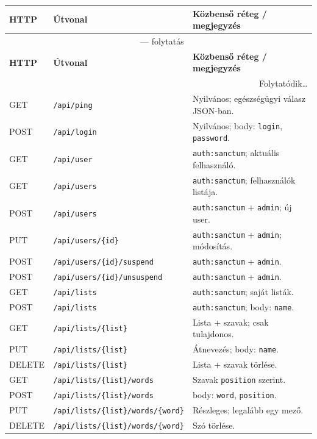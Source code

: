 {\small
\begin{longtable}{@{}llp{6.8cm}@{}}
\toprule
\textbf{HTTP} & \textbf{Útvonal} & \textbf{Közbenső réteg / megjegyzés} \\
\midrule
\endfirsthead
\multicolumn{3}{c}{\tablename\ \thetable{} — folytatás} \\
\toprule
\textbf{HTTP} & \textbf{Útvonal} & \textbf{Közbenső réteg / megjegyzés} \\
\midrule
\endhead
\midrule
\multicolumn{3}{r}{Folytatódik\ldots} \\
\endfoot
\bottomrule
\endlastfoot

GET & \texttt{/api/ping} & Nyilvános; egészségügyi válasz JSON-ban. \\
POST & \texttt{/api/login} & Nyilvános; body: \texttt{login}, \texttt{password}. \\
\midrule
GET & \texttt{/api/user} & \texttt{auth:sanctum}; aktuális felhasználó. \\
GET & \texttt{/api/users} & \texttt{auth:sanctum}; felhasználók listája. \\
POST & \texttt{/api/users} & \texttt{auth:sanctum} + \texttt{admin}; új user. \\
PUT & \texttt{/api/users/\{id\}} & \texttt{auth:sanctum} + \texttt{admin}; módosítás. \\
POST & \texttt{/api/users/\{id\}/suspend} & \texttt{auth:sanctum} + \texttt{admin}. \\
POST & \texttt{/api/users/\{id\}/unsuspend} & \texttt{auth:sanctum} + \texttt{admin}. \\
\midrule
GET & \texttt{/api/lists} & \texttt{auth:sanctum}; saját listák. \\
POST & \texttt{/api/lists} & \texttt{auth:sanctum}; body: \texttt{name}. \\
GET & \texttt{/api/lists/\{list\}} & Lista + szavak; csak tulajdonos. \\
PUT & \texttt{/api/lists/\{list\}} & Átnevezés; body: \texttt{name}. \\
DELETE & \texttt{/api/lists/\{list\}} & Lista + szavak törlése. \\
GET & \texttt{/api/lists/\{list\}/words} & Szavak \texttt{position} szerint. \\
POST & \texttt{/api/lists/\{list\}/words} & body: \texttt{word}, \texttt{position}. \\
PUT & \texttt{/api/lists/\{list\}/words/\{word\}} & Részleges; legalább egy mező. \\
DELETE & \texttt{/api/lists/\{list\}/words/\{word\}} & Szó törlése. \\

\end{longtable}}
